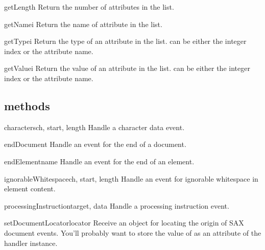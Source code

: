\documentclass{howto}
\begin{document}
\begin{methoddesc}{getLength}{}
Return the number of attributes in the list.
\end{methoddesc}

\begin{methoddesc}{getName}{i}
Return the name of attribute  in the list.
\end{methoddesc}

\begin{methoddesc}{getType}{i}
Return the type of an attribute in the list.  can be
either the integer index or the attribute name.
\end{methoddesc}

\begin{methoddesc}{getValue}{i}
Return the value of an attribute in the list.  can be
either the integer index or the attribute name.
\end{methoddesc}

\subsection{ methods}

\begin{methoddesc}{characters}{ch, start, length}
Handle a character data event.
\end{methoddesc}

\begin{methoddesc}{endDocument}{}
Handle an event for the end of a document.
\end{methoddesc}

\begin{methoddesc}{endElement}{name}
Handle an event for the end of an element.
\end{methoddesc}

\begin{methoddesc}{ignorableWhitespace}{ch, start, length}
Handle an event for ignorable whitespace in element content.
\end{methoddesc}

\begin{methoddesc}{processingInstruction}{target, data}
Handle a processing instruction event.
\end{methoddesc}

\begin{methoddesc}{setDocumentLocator}{locator}
Receive 
an object for locating the origin of SAX document events.  You'll probably want to store the value of  as an attribute of the handler instance.
\end{methoddesc}
\end{document}
